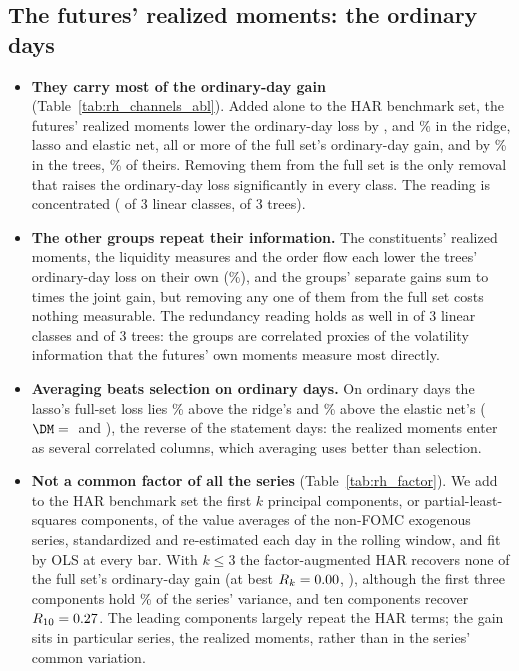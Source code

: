\subsection{The futures' realized moments: the ordinary days}
\label{sec:rh_fi_ordinary}
\begin{itemize}
\item \textbf{They carry most of the ordinary-day gain} (Table~\ref{tab:rh_channels_abl}). Added alone to the HAR
  benchmark set, the futures' realized moments lower the ordinary-day loss by \rhchRidgeOrdAddRmPct,
  \rhchLassoOrdAddRmPct{} and \rhchEnetOrdAddRmPct\% in the ridge, lasso and elastic net, all or more of the full
  set's ordinary-day gain, and by \% in the trees, \%
  of theirs. Removing them from the full set is the only removal that raises the ordinary-day loss significantly in
  every class. The reading is concentrated (\rhchLinOrdNConcTest{} of 3 linear classes, \rhchTreeOrdNConcTest{} of 3
  trees).
\item \textbf{The other groups repeat their information.} The constituents' realized moments, the liquidity measures
  and the order flow each lower the trees' ordinary-day loss on their own (\%), and
  the groups' separate gains sum to  times the joint gain, but removing any one of them
  from the full set costs nothing measurable. The redundancy reading holds as well in \rhchLinOrdNRedTest{} of 3
  linear classes and \rhchTreeOrdNRedTest{} of 3 trees: the groups are correlated proxies of the volatility
  information that the futures' own moments measure most directly.
\item \textbf{Averaging beats selection on ordinary days.} On ordinary days the lasso's full-set loss lies
  \rhchLassoRidgeOrdPct\% above the ridge's and \rhchLassoEnetOrdPct\% above the elastic net's
  ($\DM={}$\rhchLassoRidgeOrdDm{} and \rhchLassoEnetOrdDm), the reverse of the statement days: the realized moments enter as
  several correlated columns, which averaging uses better than selection.
\item \textbf{Not a common factor of all the series} (Table~\ref{tab:rh_factor}). We add to the HAR benchmark set the
  first $k$ principal components, or partial-least-squares components, of the value averages of the \rhfaNSeries{}
  non-FOMC exogenous series, standardized and re-estimated each day in the rolling window, and fit by OLS at every bar.
  With $k \le 3$ the factor-augmented HAR recovers none of the full set's ordinary-day gain (at best $R_k =
  0.00$, \rhfaBestSmall), although the first three components hold \rhfaShareCumThree\% of the series'
  variance, and ten components recover $R_{10} = 0.27$. The leading components largely repeat the HAR
  terms; the gain sits in particular series, the realized moments, rather than in the series' common variation.
\end{itemize}

